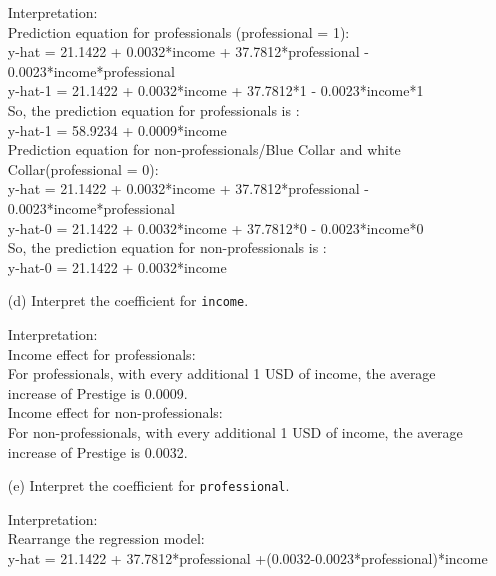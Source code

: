 \documentclass[12pt,letterpaper]{article}
\begin{document}
\begin{enumerate}
	Interpretation:\\
	Prediction equation for professionals (professional = 1):\\
	
	y-hat = 21.1422 + 0.0032*income + 37.7812*professional - 0.0023*income*professional\\
	y-hat-1 = 21.1422 + 0.0032*income + 37.7812*1 - 0.0023*income*1 \\
	
	So, the prediction equation for professionals is : \\
	y-hat-1 = 58.9234 + 0.0009*income\\
	
	\noindent
	Prediction equation for non-professionals/Blue Collar and white Collar(professional = 0):\\
	
	y-hat = 21.1422 + 0.0032*income + 37.7812*professional - 0.0023*income*professional\\
	y-hat-0 = 21.1422 + 0.0032*income + 37.7812*0 - 0.0023*income*0\\
	
	So, the prediction equation for non-professionals is : \\
	y-hat-0 = 21.1422 + 0.0032*income\\

\newpage
	\item [(d)]
	Interpret the coefficient for \texttt{income}.
	
	\vspace{1cm}	
	\noindent
	Interpretation:\\
	Income effect for professionals:\\
	For professionals, with every additional 1 USD of income, the average increase of Prestige is 0.0009.\\
	
	Income effect for non-professionals:\\
	For non-professionals, with every additional 1 USD of income, the average increase of Prestige is 0.0032.\\
	\item [(e)]
	Interpret the coefficient for \texttt{professional}.\\
	\noindent
	
	Interpretation:\\
	Rearrange the regression model: \\
	y-hat = 21.1422 + 37.7812*professional +(0.0032-0.0023*professional)*income\\
	

\end{enumerate}
\end{document}
